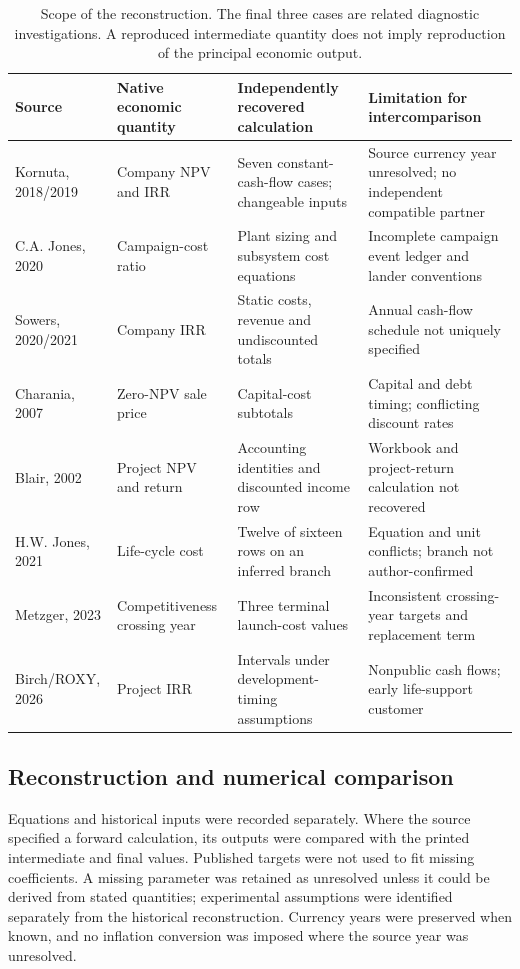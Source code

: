 \documentclass[final,5p,times,twocolumn]{elsarticle}
\begin{document}
\begin{table}[t]
\caption{Scope of the reconstruction. The final three cases are related diagnostic investigations. A reproduced intermediate quantity does not imply reproduction of the principal economic output.}
\label{tab:scope}
\centering\small
\begin{tabularx}{\textwidth}{@{}>{\raggedright\arraybackslash}p{27mm}>{\raggedright\arraybackslash}p{29mm}>{\raggedright\arraybackslash}X>{\raggedright\arraybackslash}X@{}}
\toprule
Source & Native economic quantity & Independently recovered calculation & Limitation for intercomparison \\
\midrule
Kornuta, 2018/2019 & Company NPV and IRR & Seven constant-cash-flow cases; changeable inputs & Source currency year unresolved; no independent compatible partner \\
C.A. Jones, 2020 & Campaign-cost ratio & Plant sizing and subsystem cost equations & Incomplete campaign event ledger and lander conventions \\
Sowers, 2020/2021 & Company IRR & Static costs, revenue and undiscounted totals & Annual cash-flow schedule not uniquely specified \\
Charania, 2007 & Zero-NPV sale price & Capital-cost subtotals & Capital and debt timing; conflicting discount rates \\
Blair, 2002 & Project NPV and return & Accounting identities and discounted income row & Workbook and project-return calculation not recovered \\
H.W. Jones, 2021 & Life-cycle cost & Twelve of sixteen rows on an inferred branch & Equation and unit conflicts; branch not author-confirmed \\
Metzger, 2023 & Competitiveness crossing year & Three terminal launch-cost values & Inconsistent crossing-year targets and replacement term \\
Birch/ROXY, 2026 & Project IRR & Intervals under development-timing assumptions & Nonpublic cash flows; early life-support customer \\
\bottomrule
\end{tabularx}
\end{table}

\subsection{Reconstruction and numerical comparison}
Equations and historical inputs were recorded separately. Where the source specified a forward calculation, its outputs were compared with the printed intermediate and final values. Published targets were not used to fit missing coefficients. A missing parameter was retained as unresolved unless it could be derived from stated quantities; experimental assumptions were identified separately from the historical reconstruction. Currency years were preserved when known, and no inflation conversion was imposed where the source year was unresolved.
\end{document}
